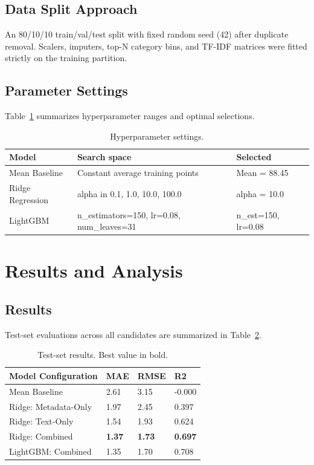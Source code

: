 \documentclass[conference]{IEEEtran}
\begin{document}
\subsection{Data Split Approach}
An 80/10/10 train/val/test split with fixed random seed (42) after duplicate removal. Scalers, imputers, top-N category bins, and TF-IDF matrices were fitted strictly on the training partition.

\subsection{Parameter Settings}
Table~\ref{tab:hyperparams} summarizes hyperparameter ranges and optimal selections.

\begin{table}[htbp]
\caption{Hyperparameter settings.}
\label{tab:hyperparams}
\centering
\begin{tabular}{lll}
\toprule
\textbf{Model} & \textbf{Search space} & \textbf{Selected} \\
\midrule
Mean Baseline & Constant average training points & Mean = 88.45 \\
Ridge Regression & alpha in {0.1, 1.0, 10.0, 100.0} & alpha = 10.0 \\
LightGBM & n_estimators=150, lr=0.08, num_leaves=31 & n_est=150, lr=0.08 \\
\bottomrule
\end{tabular}
\end{table}

\section{Results and Analysis}
\subsection{Results}
Test-set evaluations across all candidates are summarized in Table~\ref{tab:results}.

\begin{table}[htbp]
\caption{Test-set results. Best value in bold.}
\label{tab:results}
\centering
\begin{tabular}{llll}
\toprule
\textbf{Model Configuration} & \textbf{MAE} & \textbf{RMSE} & \textbf{R2} \\
\midrule
Mean Baseline & 2.61 & 3.15 & -0.000 \\
Ridge: Metadata-Only & 1.97 & 2.45 & 0.397 \\
Ridge: Text-Only & 1.54 & 1.93 & 0.624 \\
Ridge: Combined & \textbf{1.37} & \textbf{1.73} & \textbf{0.697} \\
LightGBM: Combined & 1.35 & 1.70 & 0.708 \\
\bottomrule
\end{tabular}
\end{table}
\end{document}
